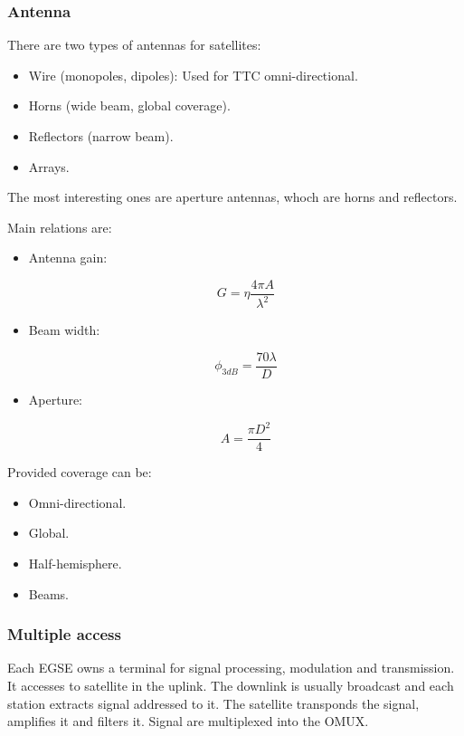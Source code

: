 \documentclass[../main.tex]{subfiles}
\begin{document}
\subsubsection{Antenna}

There are two types of antennas for satellites:
\begin{itemize}
	\item Wire (monopoles, dipoles): Used for TTC omni-directional.
	\item Horns (wide beam, global coverage).
	\item Reflectors (narrow beam).
	\item Arrays.
\end{itemize}

The most interesting ones are aperture antennas, whoch are horns and reflectors.

Main relations are:

\begin{itemize}
	\item {
		Antenna gain:

		$$
			G = \eta \frac {4 \pi A} {\lambda^2}
		$$
	}
	\item {
		Beam width:

		$$
			\phi_{3dB} = \frac {70 \lambda} {D}
		$$
	}
	\item {
		Aperture:

		$$
			A = \frac {\pi D^2} {4}
		$$
	}
\end{itemize}

Provided coverage can be:
\begin{itemize}
	\item Omni-directional.
	\item Global.
	\item Half-hemisphere.
	\item Beams.
\end{itemize}

\subsubsection{Multiple access}

Each EGSE owns a terminal for signal processing, modulation and transmission. It accesses to satellite in the uplink. The downlink is usually broadcast and each station extracts signal addressed to it. The satellite transponds the signal, amplifies it and filters it. Signal are multiplexed into the OMUX.
\end{document}
